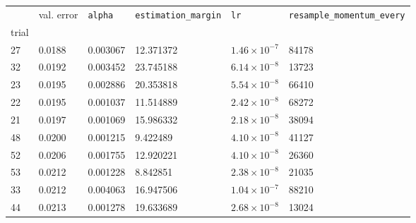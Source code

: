 \begin{tabular}{lp{2.3cm}p{2.3cm}p{2.3cm}p{2.3cm}p{2.3cm}}
\toprule
{} &  val. error &  \texttt{alpha} &  \texttt{estimation\_margin} &         \texttt{lr} &  \texttt{resample\_momentum\_every} \\
trial &             &                 &                              &                     &                                     \\
\midrule
27    &      0.0188 &        0.003067 &                    12.371372 & $1.46\times10^{-7}$ &                               84178 \\
32    &      0.0192 &        0.003452 &                    23.745188 & $6.14\times10^{-8}$ &                               13723 \\
23    &      0.0195 &        0.002886 &                    20.353818 & $5.54\times10^{-8}$ &                               66410 \\
22    &      0.0195 &        0.001037 &                    11.514889 & $2.42\times10^{-8}$ &                               68272 \\
21    &      0.0197 &        0.001069 &                    15.986332 & $2.18\times10^{-8}$ &                               38094 \\
48    &      0.0200 &        0.001215 &                     9.422489 & $4.10\times10^{-8}$ &                               41127 \\
52    &      0.0206 &        0.001755 &                    12.920221 & $4.10\times10^{-8}$ &                               26360 \\
53    &      0.0212 &        0.001228 &                     8.842851 & $2.38\times10^{-8}$ &                               21035 \\
33    &      0.0212 &        0.004063 &                    16.947506 & $1.04\times10^{-7}$ &                               88210 \\
44    &      0.0213 &        0.001278 &                    19.633689 & $2.68\times10^{-8}$ &                               13024 \\
\bottomrule
\end{tabular}
